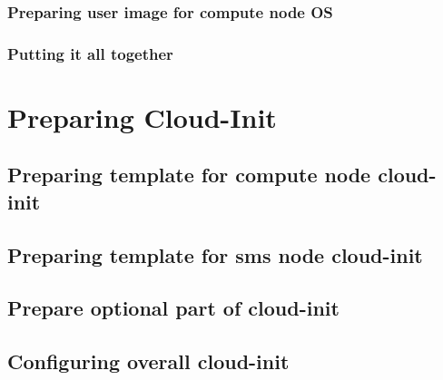\documentclass[letterpaper]{article}
\begin{document}
\newpage
\subsubsection{Preparing user image for compute node OS}\label{sec:compute_node_images}


\newpage
\subsubsection{Putting it all together }\label{sec:compute_node_images_all_together}



\clearpage

\section{Preparing Cloud-Init} \label{sec:cloud-init_prep}



\subsection{Preparing template for compute node cloud-init} \label{sec:c_i-template_compute_node}



\newpage
\subsection{Preparing template for sms node cloud-init} \label{sec:c_i-template-sms-node}

	

\subsection{Prepare optional part of cloud-init} \label{sec:c_i-optional}



\newpage
\subsection{Configuring overall cloud-init} \label{sec:c_i-config}
\end{document}
